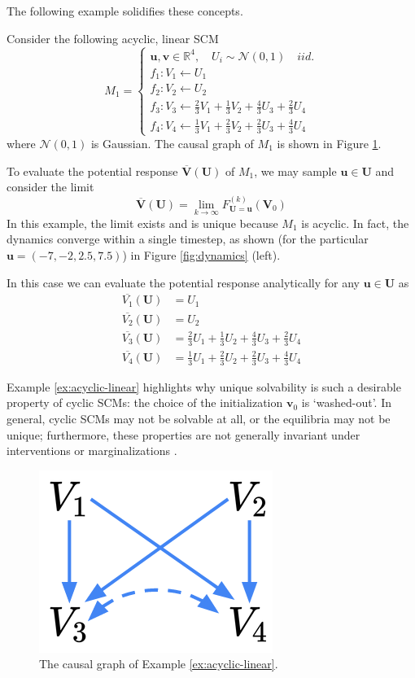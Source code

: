 \documentclass[12pt]{article}
\begin{document}
The following example solidifies these concepts.

\begin{example}\label{ex:acyclic-linear}
Consider the following acyclic, linear SCM
\[
M_1 = 
\begin{cases}
\mathbf{u}, \mathbf{v}\in \mathbb{R}^4, \quad U_i \sim \mathcal{N}(0,1) \quad iid. \\
f_1:V_1\leftarrow U_1 \\
f_2:V_2\leftarrow U_2 \\
f_3:V_3\leftarrow \frac{2}{3}V_1+\frac{1}{3}V_2+\frac{4}{3}U_3+\frac{2}{3}U_4 \\
f_4:V_4\leftarrow \frac{1}{3}V_1+\frac{2}{3}V_2+\frac{2}{3}U_3+\frac{4}{3}U_4
\end{cases}
\]
where $\mathcal{N}(0,1)$ is Gaussian.
The causal graph of $M_1$ is shown in Figure \ref{fig:acyclic-graph}.

To evaluate the potential response $\overline{\mathbf{V}}(\mathbf{U})$ of $M_1$, we may sample $\mathbf{u}\in\mathbf{U}$ and consider the limit
\[
\overline{\mathbf{V}}(\mathbf{U})= \lim_{k\to\infty}F_{\mathbf{U}=\mathbf{u}}^{(k)}(\mathbf{V}_0)
\]
In this example, the limit exists and is unique because $M_1$ is acyclic. In fact, the dynamics converge within a single timestep, as shown (for the particular $\mathbf{u}=(-7,-2,2.5,7.5)$) in Figure \ref{fig:dynamics} (left).

In this case we can evaluate the potential response analytically for any $\mathbf{u}\in\mathbf{U}$ as
\begin{align*}
\overline{V_1}(\mathbf{U}) &= U_1 \\
\overline{V_2}(\mathbf{U}) &= U_2 \\
\overline{V_3}(\mathbf{U}) &= \frac{2}{3}U_1+\frac{1}{3}U_2+\frac{4}{3}U_3+\frac{2}{3}U_4 \\
\overline{V_4}(\mathbf{U}) &= \frac{1}{3}U_1+\frac{2}{3}U_2+\frac{2}{3}U_3+\frac{4}{3}U_4
\end{align*}
\end{example}

Example \ref{ex:acyclic-linear} highlights why unique solvability is such a desirable property of cyclic SCMs: the choice of the initialization $\mathbf{v}_0$ is `washed-out'. In general, cyclic SCMs may not be solvable at all, or the equilibria may not be unique; furthermore, these properties are not generally invariant under interventions or marginalizations \cite{Foundations}.

\begin{figure}
\centering
\includegraphics[width=.2\linewidth]{pics/my_own/acyclic_graph.png}
\caption{The causal graph of Example \ref{ex:acyclic-linear}.}
\label{fig:acyclic-graph}
\end{figure}
\end{document}
